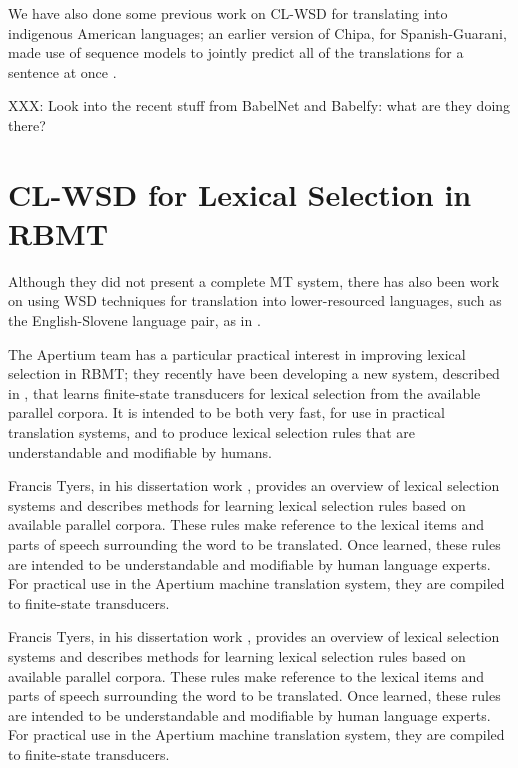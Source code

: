 We have also done some previous work on CL-WSD for translating into indigenous
American languages; an earlier version of Chipa, for Spanish-Guarani, made use
of sequence models to jointly predict all of the translations for a sentence at
once \cite{rudnick-gasser:2013:HyTra}.

XXX:
Look into the recent stuff from BabelNet and Babelfy: what are they doing
there?


\section{CL-WSD for Lexical Selection in RBMT}

Although they did not present a complete MT system, there has also been work
on using WSD techniques for translation into lower-resourced languages, such as
the English-Slovene language pair, as in
\cite{vintar-fivser-vrvsvcaj:2012:ESIRMT-HyTra2012}. 

The Apertium team has a particular practical interest in improving lexical
selection in RBMT; they recently have been developing
a new system, described in \cite{tyers-fst}, that learns finite-state
transducers for lexical selection from the available parallel corpora. It is
intended to be both very fast, for use in practical translation systems, and
to produce lexical selection rules that are understandable and modifiable by
humans.

Francis Tyers, in his dissertation work \cite{tyers-dissertation},
provides an overview of lexical selection systems and describes methods for
learning lexical selection rules based on available parallel corpora.
These rules make reference to the lexical items and parts of speech surrounding
the word to be translated. Once learned, these rules are intended to be
understandable and modifiable by human language experts. For practical use in
the Apertium machine translation system, they are compiled to finite-state
transducers.


Francis Tyers, in his dissertation work \cite{tyers-dissertation},
provides an overview of lexical selection systems and describes methods for
learning lexical selection rules based on available parallel corpora. These
rules make reference to the lexical items and parts of speech surrounding the
word to be translated. Once learned, these rules are intended to be
understandable and modifiable by human language experts. For practical use in
the Apertium machine translation system, they are compiled to finite-state
transducers.

